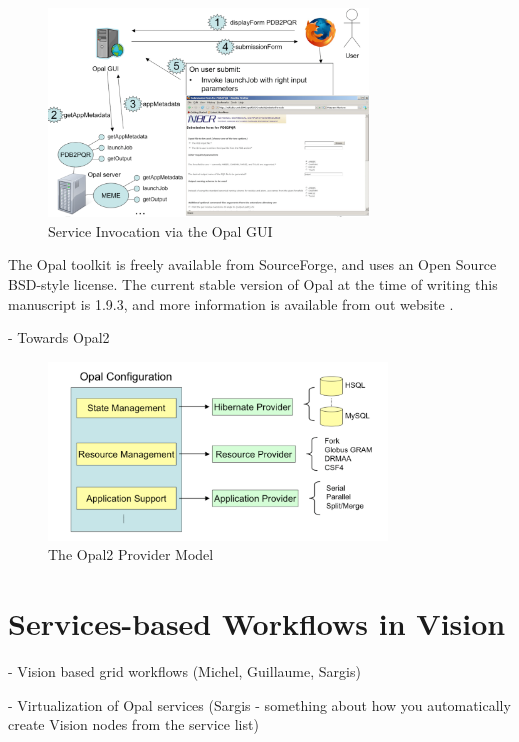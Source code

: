 \documentclass[conference]{IEEEtran}
\begin{document}
\begin{figure}
\begin{center}
\includegraphics[width=8.5cm]{opal-gui}
\end{center}
\caption{Service Invocation via the Opal GUI}
\label{fig:opal-gui}
\end{figure}

The Opal toolkit is freely available from SourceForge, and uses an Open
Source BSD-style license. The current stable version of Opal at the time of
writing this manuscript is 1.9.3, and more information is available from
out website \cite{opal-website}.

- Towards Opal2

\begin{figure}
\begin{center}
\includegraphics[width=9cm]{opal2-providers}
\end{center}
\caption{The Opal2 Provider Model}
\label{fig:opal2-providers}
\end{figure}

\section {Services-based Workflows in Vision}

- Vision based grid workflows (Michel, Guillaume, Sargis)

- Virtualization of Opal services (Sargis - something about how you
automatically create Vision nodes from the service list)
\end{document}

